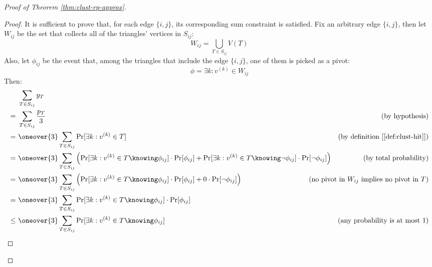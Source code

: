 \begin{proof}[Proof of Theorem \ref{thm:clust-rp-approx}]

    \begin{proof}
        It is sufficient to prove that, for each edge $\{i, j\}$, its corresponding sum constraint is satisfied. Fix an arbitrary edge $\{i, j\}$, then let $W_{ij}$ be the set that collects all of the triangles' vertices in $S_{ij}$:
        \[
            W_{ij} = \bigcup_{T \in S_{ij}} V(T)
        \]
        Also, let $\phi_{ij}$ be the event that, among the triangles that include the edge $\{i, j\}$, one of them is picked as a pivot:
        \[
            \phi = \exists k : v^{(k)} \in W_{ij}
        \]
        Then:
        \begin{align*}
                &\ \sum_{T \in S_{ij}} y_T                                                           & \\
               =&\ \sum_{T \in S_{ij}} \frac{p_T}{3}                                                 & \text{(by hypothesis)}\\
               =&\ \oneover{3} \sum_{T \in S_{ij}} \Pr[\exists k : v^{(k)} \in T]                    & \text{(by definition [\ref{def:clust-hit}])} \\
               =&\ \oneover{3} \sum_{T \in S_{ij}} \left( \Pr[\exists k : v^{(k)} \in T \knowing \phi_{ij}] \cdot \Pr[\phi_{ij}] +  \Pr[\exists k : v^{(k)} \in T \knowing \neg \phi_{ij}] \cdot \Pr[\neg \phi_{ij}] \right)                            & \text{(by total probability)} \\
               =&\ \oneover{3} \sum_{T \in S_{ij}} \left( \Pr[\exists k : v^{(k)} \in T \knowing \phi_{ij}] \cdot \Pr[\phi_{ij}] + 0 \cdot \Pr[\neg \phi_{ij}] \right)                                                                               & \mathllap{\text{(no pivot in $W_{ij}$ implies no pivot in $T$)}} \\
               =&\ \oneover{3} \sum_{T \in S_{ij}} \Pr[\exists k : v^{(k)} \in T \knowing \phi_{ij}] \cdot \Pr[\phi_{ij}] & \\
            \leq&\ \oneover{3} \sum_{T \in S_{ij}} \Pr[\exists k : v^{(k)} \in T \knowing \phi_{ij}] & \mathllap{\text{(any probability is at most $1$)}}
        \end{align*}


\end{proof}
\end{proof}
